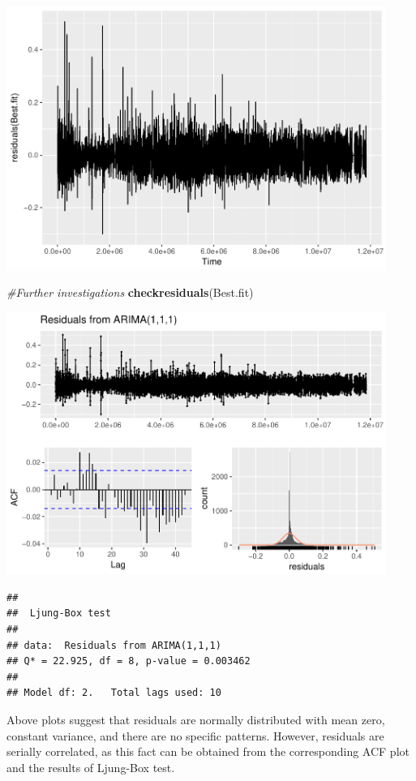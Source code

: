 \documentclass[]{article}
\newenvironment{Shaded}{\begin{snugshade}}{\end{snugshade}}
\newcommand{\KeywordTok}[1]{\textcolor[rgb]{0.13,0.29,0.53}{\textbf{#1}}}
\newcommand{\CommentTok}[1]{\textcolor[rgb]{0.56,0.35,0.01}{\textit{#1}}}
\newcommand{\NormalTok}[1]{#1}
\begin{document}
\includegraphics[width=468]{README_figs/README-unnamed-chunk-18-1}

\begin{Shaded}
\begin{Highlighting}[]

\CommentTok{#Further investigations}
\KeywordTok{checkresiduals}\NormalTok{(Best.fit)}
\end{Highlighting}
\end{Shaded}

\includegraphics[width=468]{README_figs/README-unnamed-chunk-18-2}

\begin{verbatim}
## 
##  Ljung-Box test
## 
## data:  Residuals from ARIMA(1,1,1)
## Q* = 22.925, df = 8, p-value = 0.003462
## 
## Model df: 2.   Total lags used: 10
\end{verbatim}

Above plots suggest that residuals are normally distributed with mean
zero, constant variance, and there are no specific patterns. However,
residuals are serially correlated, as this fact can be obtained from the
corresponding ACF plot and the results of Ljung-Box test.
\end{document}
